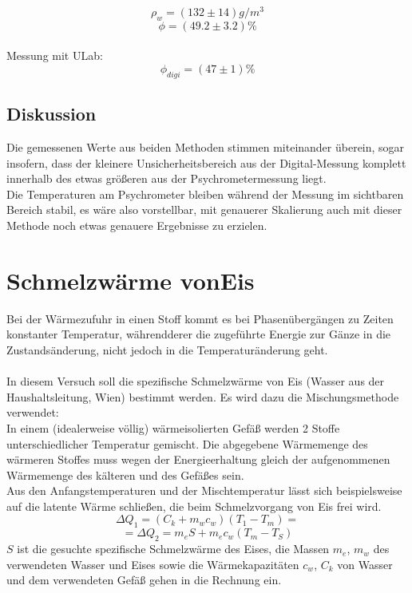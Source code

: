 \documentclass[12pt,a4paper]{article}
\begin{document}
\begin{multicols}{2}
$$\rho_w= (132 \pm 14)g/m^3$$
$$\phi =(49.2\pm 3.2)\%$$
\\
Messung mit ULab:
$$\phi_{digi}=(47 \pm 1)\%$$

\subsection{Diskussion}

Die gemessenen Werte aus beiden Methoden stimmen miteinander überein, sogar insofern, dass der kleinere Unsicherheitsbereich aus der Digital-Messung komplett innerhalb des etwas größeren aus der Psychrometermessung liegt.\\
Die Temperaturen am Psychrometer bleiben während der Messung im sichtbaren Bereich stabil, es wäre also vorstellbar, mit genauerer Skalierung auch mit dieser Methode noch etwas genauere Ergebnisse zu erzielen.\\



\section{Schmelzwärme vonEis}
Bei der Wärmezufuhr in einen Stoff kommt es bei Phasenübergängen zu Zeiten konstanter Temperatur, währendderer die zugeführte Energie zur Gänze in die Zustandsänderung, nicht jedoch in die Temperaturänderung geht.\\
\\
In diesem Versuch soll die spezifische Schmelzwärme von Eis (Wasser aus der Haushaltsleitung, Wien) bestimmt werden. Es wird dazu die Mischungsmethode verwendet:\\
In einem (idealerweise völlig) wärmeisolierten Gefäß werden 2 Stoffe unterschiedlicher Temperatur gemischt. Die abgegebene Wärmemenge des wärmeren Stoffes muss wegen der Energieerhaltung gleich der aufgenommenen Wärmemenge des kälteren und des Gefäßes sein.\\
Aus den Anfangstemperaturen und der Mischtemperatur lässt sich beispielsweise auf die latente Wärme schließen, die beim Schmelzvorgang von Eis frei wird.
$$\Delta Q_1=(C_k+m_wc_w)(T_1-T_m)=$$
$$=\Delta Q_2 = m_eS+m_ec_w(T_m-T_S)$$
$S$ ist die gesuchte spezifische Schmelzwärme des Eises, die Massen $m_e$, $m_w$ des verwendeten Wasser und Eises sowie die Wärmekapazitäten $c_w$, $C_k$ von Wasser und dem verwendeten Gefäß gehen in die Rechnung ein.\\



\end{multicols}
\end{document}
